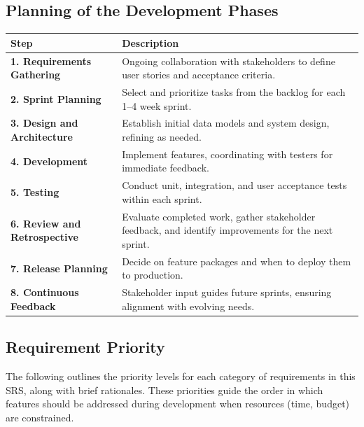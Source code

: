 \documentclass[12pt]{article}
\begin{document}
\subsection{Planning of the Development Phases}
\begin{longtable}{| m{3cm} | m{10cm} |}
  \hline
  \textbf{Step} & \textbf{Description} \\
  \hline
  \textbf{1. Requirements Gathering} & Ongoing collaboration with stakeholders to define user stories and acceptance criteria. \\
  \hline
  \textbf{2. Sprint Planning} & Select and prioritize tasks from the backlog for each 1--4 week sprint. \\
  \hline
  \textbf{3. Design and Architecture} & Establish initial data models and system design, refining as needed. \\
  \hline
  \textbf{4. Development} & Implement features, coordinating with testers for immediate feedback. \\
  \hline
  \textbf{5. Testing} & Conduct unit, integration, and user acceptance tests within each sprint. \\
  \hline
  \textbf{6. Review and Retrospective} & Evaluate completed work, gather stakeholder feedback, and identify improvements for the next sprint. \\
  \hline
  \textbf{7. Release Planning} & Decide on feature packages and when to deploy them to production. \\
  \hline
  \textbf{8. Continuous Feedback} & Stakeholder input guides future sprints, ensuring alignment with evolving needs. \\
  \hline
\end{longtable}

\subsection{Requirement Priority}

The following outlines the priority levels for each category of requirements in this SRS, along with brief rationales. These priorities guide the order in which features should be addressed during development when resources (time, budget) are constrained.
\end{document}

